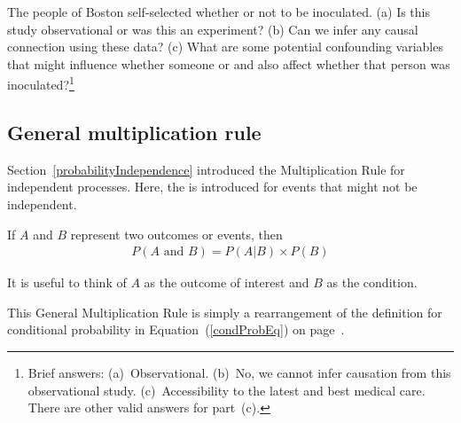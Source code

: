 \begin{doublespace}
\begin{exercise}\label{SmallpoxInoculationObsExpExercise}
The people of Boston self-selected whether or not to be inoculated. (a) Is this study observational or was this an experiment? (b) Can we infer any causal connection using these data? (c) What are some potential confounding variables that might influence whether someone  or  and also affect whether that person was inoculated?\footnote{Brief answers: (a)~Observational. (b)~No, we cannot infer causation from this observational study. (c)~Accessibility to the latest and best medical care. There are other valid answers for part~(c).}
\end{exercise}

\subsection{General multiplication rule}

Section~\ref{probabilityIndependence} introduced the Multiplication Rule for independent processes. Here, the  is introduced for events that might not be independent.

\begin{termBox}{
If $A$ and $B$ represent two outcomes or events, then \vspace{-1.5mm}
\begin{eqnarray*}
P(A\text{ and }B) = P(A | B)\times P(B)
\end{eqnarray*} \vspace{-6.5mm} \par
It is useful to think of $A$ as the outcome of interest and $B$ as the condition.}
\end{termBox}
This General Multiplication Rule is simply a rearrangement of the definition for conditional probability in Equation~(\ref{condProbEq}) on page~\pageref{condProbEq}.


\end{doublespace}
